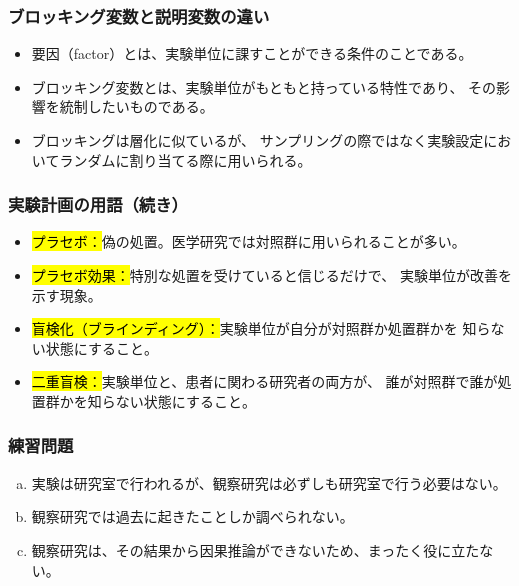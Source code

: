 
\begin{frame}
\frametitle{ブロッキング変数と説明変数の違い}

\begin{itemize}

\item 要因（factor）とは、実験単位に課すことができる条件のことである。

\item ブロッキング変数とは、実験単位がもともと持っている特性であり、
その影響を統制したいものである。

\item ブロッキングは層化に似ているが、
サンプリングの際ではなく実験設定においてランダムに割り当てる際に用いられる。

\end{itemize}

\end{frame}


\begin{frame}
\frametitle{実験計画の用語（続き）}

\begin{itemize}

\item \hl{プラセボ：}偽の処置。医学研究では対照群に用いられることが多い。

\item \hl{プラセボ効果：}特別な処置を受けていると信じるだけで、
実験単位が改善を示す現象。

\item \hl{盲検化（ブラインディング）：}実験単位が自分が対照群か処置群かを
知らない状態にすること。

\item \hl{二重盲検：}実験単位と、患者に関わる研究者の両方が、
誰が対照群で誰が処置群かを知らない状態にすること。

\end{itemize}

\end{frame}


\begin{frame}
\frametitle{練習問題}


\begin{enumerate}[(a)]
\item 実験は研究室で行われるが、観察研究は必ずしも研究室で行う必要はない。
\item 観察研究では過去に起きたことしか調べられない。
\item 観察研究は、その結果から因果推論ができないため、まったく役に立たない。
\end{enumerate}

\end{frame}

